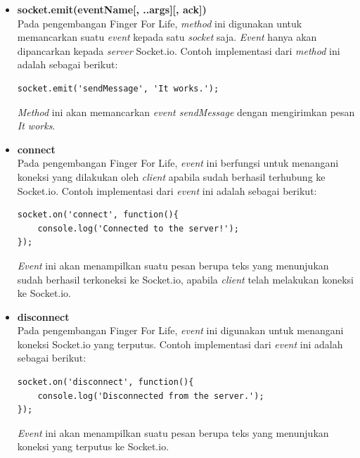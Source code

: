 \begin{enumerate}
\begin{enumerate}
\begin{enumerate}
\begin{itemize}
				\item \textbf{socket.emit(eventName[, ..args][, ack])} \\
				Pada pengembangan Finger For Life, \textit{method} ini digunakan untuk memancarkan suatu \textit{event} kepada satu \textit{socket} saja. \textit{Event} hanya akan dipancarkan kepada \textit{server} Socket.io. Contoh implementasi dari \textit{method} ini adalah sebagai berikut:
\begin{lstlisting}
socket.emit('sendMessage', 'It works.');
\end{lstlisting}
\textit{Method} ini akan memancarkan \textit{event sendMessage} dengan mengirimkan pesan \textit{It works}.
			\end{itemize}
		
			\begin{itemize}
				\item \textbf{connect} \\
				Pada pengembangan Finger For Life, \textit{event} ini berfungsi untuk menangani koneksi yang dilakukan oleh \textit{client} apabila sudah berhasil terhubung ke Socket.io. Contoh implementasi dari \textit{event} ini adalah sebagai berikut:
\begin{lstlisting}
socket.on('connect', function(){
	console.log('Connected to the server!');
});
\end{lstlisting}
				\textit{Event} ini akan menampilkan suatu pesan berupa teks yang menunjukan sudah berhasil terkoneksi ke Socket.io, apabila \textit{client} telah melakukan koneksi ke Socket.io.

				\item \textbf{disconnect} \\
				Pada pengembangan Finger For Life, \textit{event} ini digunakan untuk menangani koneksi Socket.io yang terputus. Contoh implementasi dari \textit{event} ini adalah sebagai berikut:
\begin{lstlisting}
socket.on('disconnect', function(){
	console.log('Disconnected from the server.');
});
\end{lstlisting}
				\textit{Event} ini akan menampilkan suatu pesan berupa teks yang menunjukan koneksi yang terputus ke Socket.io.

			\end{itemize}
		\end{enumerate}
	\end{enumerate}
	

\end{enumerate}

